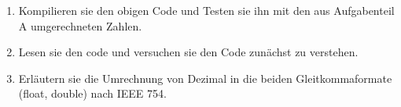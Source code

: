 \documentclass[paper=a4,fontsize=11pt]{scrartcl}%
\numberwithin{equation}{section}
\begin{document}
\begin{enumerate}
	\item Kompilieren sie den obigen Code und Testen sie ihn mit den aus Aufgabenteil A umgerechneten Zahlen.
	\item Lesen sie den code und versuchen sie den Code zunächst zu verstehen.
	\item Erläutern sie die Umrechnung von Dezimal in die beiden Gleitkommaformate (float, double) nach IEEE 754.
\end{enumerate}
\end{document}
